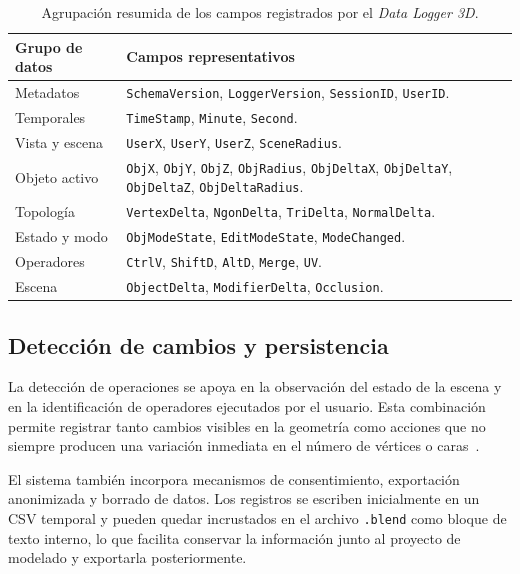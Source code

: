 \begin{table}[H]
\centering
\small
\begin{tabularx}{\textwidth}{p{}X}
\toprule
\textbf{Grupo de datos} & \textbf{Campos representativos} \\
\midrule
Metadatos & \texttt{SchemaVersion}, \texttt{LoggerVersion}, \texttt{SessionID}, \texttt{UserID}. \\
Temporales & \texttt{TimeStamp}, \texttt{Minute}, \texttt{Second}. \\
Vista y escena & \texttt{UserX}, \texttt{UserY}, \texttt{UserZ}, \texttt{SceneRadius}. \\
Objeto activo & \texttt{ObjX}, \texttt{ObjY}, \texttt{ObjZ}, \texttt{ObjRadius}, \texttt{ObjDeltaX}, \texttt{ObjDeltaY}, \texttt{ObjDeltaZ}, \texttt{ObjDeltaRadius}. \\
Topología & \texttt{VertexDelta}, \texttt{NgonDelta}, \texttt{TriDelta}, \texttt{NormalDelta}. \\
Estado y modo & \texttt{ObjModeState}, \texttt{EditModeState}, \texttt{ModeChanged}. \\
Operadores & \texttt{CtrlV}, \texttt{ShiftD}, \texttt{AltD}, \texttt{Merge}, \texttt{UV}. \\
Escena & \texttt{ObjectDelta}, \texttt{ModifierDelta}, \texttt{Occlusion}. \\
\bottomrule
\end{tabularx}
\caption{Agrupación resumida de los campos registrados por el \textit{Data Logger 3D}.}
\label{tab:campos_csv_resumen}
\end{table}

\subsection{Detección de cambios y persistencia}

La detección de operaciones se apoya en la observación del estado de la escena y en la identificación de operadores ejecutados por el usuario. Esta combinación permite registrar tanto cambios visibles en la geometría como acciones que no siempre producen una variación inmediata en el número de vértices o caras~\cite{blenderapi}.

El sistema también incorpora mecanismos de consentimiento, exportación anonimizada y borrado de datos. Los registros se escriben inicialmente en un CSV temporal y pueden quedar incrustados en el archivo \texttt{.blend} como bloque de texto interno, lo que facilita conservar la información junto al proyecto de modelado y exportarla posteriormente.

